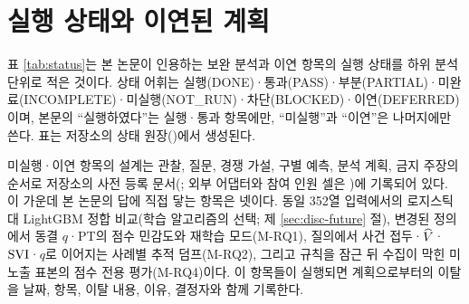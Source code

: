 \chapter{실행 상태와 이연된 계획}
\label{app:deferred}

표 \ref{tab:status}는 본 논문이 인용하는 보완 분석과 이연 항목의 실행 상태를 하위 분석 단위로 적은 것이다. 상태 어휘는 실행(DONE)·통과(PASS)·부분(PARTIAL)·미완료(INCOMPLETE)·미실행(NOT\_RUN)·차단(BLOCKED)·이연(DEFERRED)이며, 본문의 ``실행하였다''는 실행·통과 항목에만, ``미실행''과 ``이연''은 나머지에만 쓴다. 표는 저장소의 상태 원장()에서 생성된다.



미실행·이연 항목의 설계는 관찰, 질문, 경쟁 가설, 구별 예측, 분석 계획, 금지 주장의 순서로 저장소의 사전 등록 문서(; 외부 어댑터와 참여 인원 셀은 )에 기록되어 있다. 이 가운데 본 논문의 답에 직접 닿는 항목은 넷이다. 동일 352열 입력에서의 로지스틱 대 LightGBM 정합 비교(학습 알고리즘의 선택; 제 \ref{sec:disc-future} 절), 변경된 정의에서 동결 $q$·PT의 점수 민감도와 재학습 모드(M-RQ1), 질의에서 사건 접두·$\widehat V$·$\mathrm{SVI}$·$q$로 이어지는 사례별 추적 덤프(M-RQ2), 그리고 규칙을 잠근 뒤 수집이 막힌 미노출 표본의 점수 전용 평가(M-RQ4)이다. 이 항목들이 실행되면 계획으로부터의 이탈을 날짜, 항목, 이탈 내용, 이유, 결정자와 함께 기록한다.
